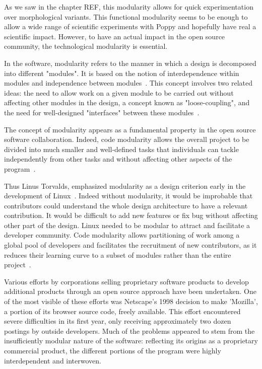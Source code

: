 As we saw in the chapter REF, this modularity allows for quick experimentation over morphological variants. This functional modularity seems to be enough to allow a wide range of scientific experiments with Poppy and hopefully have real a scientific impact. However, to have an actual impact in the open source community, the technological modularity is essential.

In the software, modularity refers to the manner in which a design is decomposed into different "modules". It is based on the notion of interdependence within modules and independence between modules~\parencite{baldwin2000design}. This concept involves two related ideas: the need to allow work on a given module to be carried out without affecting other modules in the design, a concept known as "loose-coupling", and the need for well-designed "interfaces" between these modules~\parencite{maccormack2006exploring}.

The concept of modularity appears as a fundamental property in the open source software collaboration. Indeed, code modularity allows the overall project to be divided into much smaller and well-defined tasks that individuals can tackle independently from other tasks and without affecting other aspects of the program~\parencite{narduzzo2008modularity}.

Thus Linus Torvalds, emphasized modularity as a design criterion early in the development of Linux~\parencite{dibona1999open}. Indeed without modularity, it would be improbable that contributors could understand the whole design architecture to have a relevant contribution. It would be difficult to add new features or fix bug without affecting other part of the design. Linux needed to be modular to attract and facilitate a developer community. Code modularity allows partitioning of work among a global pool of developers and facilitates the recruitment of new contributors, as it reduces their learning curve to a subset of modules rather than the entire project~\parencite{fitzgerald2004critical}.

Various efforts by corporations selling proprietary software products to develop additional products through an open source approach have been undertaken. One of the most visible of these efforts was Netscape's 1998 decision to make 'Mozilla', a portion of its browser source code, freely available. This effort encountered severe difficulties in its first year, only receiving approximately two dozen postings by outside developers. Much of the problems appeared to stem from the insufficiently modular nature of the software: reflecting its origins as a proprietary commercial product, the different portions of the program were highly interdependent and interwoven.

